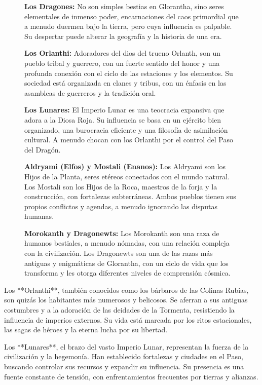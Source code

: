 \documentclass[10pt,twocolumn]{book} %
\newenvironment{GloranthaInfoBox}[1]{%
  \begin{figure}[ht!] %
    \centering
    \begin{tcolorbox}[
      breakable,
      colback=gray!5,
      colframe=gray!40,
      boxrule=0.8pt,
      title=#1,
      fonttitle=\bfseries,
      enhanced,
      sharp corners=northwest,
      sharp corners=northeast,
      rounded corners=southwest,
      rounded corners=southeast,
      width=\textwidth,
      left=3mm, right=3mm, top=3mm, bottom=3mm,
      before skip=0pt,
      after skip=0pt,
    ]%
}{%
    \end{tcolorbox}%
  \end{figure}%
}
\begin{document}
\begin{GloranthaInfoBox}{Pueblos del Paso del Dragón: Detalles Adicionales}
\textbf{Los Dragones:} No son simples bestias en Glorantha, sino seres elementales de inmenso poder, encarnaciones del caos primordial que a menudo duermen bajo la tierra, pero cuya influencia es palpable. Su despertar puede alterar la geografía y la historia de una era.

\textbf{Los Orlanthi:} Adoradores del dios del trueno Orlanth, son un pueblo tribal y guerrero, con un fuerte sentido del honor y una profunda conexión con el ciclo de las estaciones y los elementos. Su sociedad está organizada en clanes y tribus, con un énfasis en las asambleas de guerreros y la tradición oral.

\textbf{Los Lunares:} El Imperio Lunar es una teocracia expansiva que adora a la Diosa Roja. Su influencia se basa en un ejército bien organizado, una burocracia eficiente y una filosofía de asimilación cultural. A menudo chocan con los Orlanthi por el control del Paso del Dragón.

\textbf{Aldryami (Elfos) y Mostali (Enanos):} Los Aldryami son los Hijos de la Planta, seres etéreos conectados con el mundo natural. Los Mostali son los Hijos de la Roca, maestros de la forja y la construcción, con fortalezas subterráneas. Ambos pueblos tienen sus propios conflictos y agendas, a menudo ignorando las disputas humanas.

\textbf{Morokanth y Dragonewts:} Los Morokanth son una raza de humanos bestiales, a menudo nómadas, con una relación compleja con la civilización. Los Dragonewts son una de las razas más antiguas y enigmáticas de Glorantha, con un ciclo de vida que los transforma y les otorga diferentes niveles de comprensión cósmica.
\end{GloranthaInfoBox}

Los **Orlanthi**, también conocidos como los bárbaros de las Colinas Rubias, son quizás los habitantes más numerosos y belicosos. Se aferran a sus antiguas costumbres y a la adoración de las deidades de la Tormenta, resistiendo la influencia de imperios externos. Su vida está marcada por los ritos estacionales, las sagas de héroes y la eterna lucha por su libertad.

Los **Lunares**, el brazo del vasto Imperio Lunar, representan la fuerza de la civilización y la hegemonía. Han establecido fortalezas y ciudades en el Paso, buscando controlar sus recursos y expandir su influencia. Su presencia es una fuente constante de tensión, con enfrentamientos frecuentes por tierras y alianzas.
\end{document}

